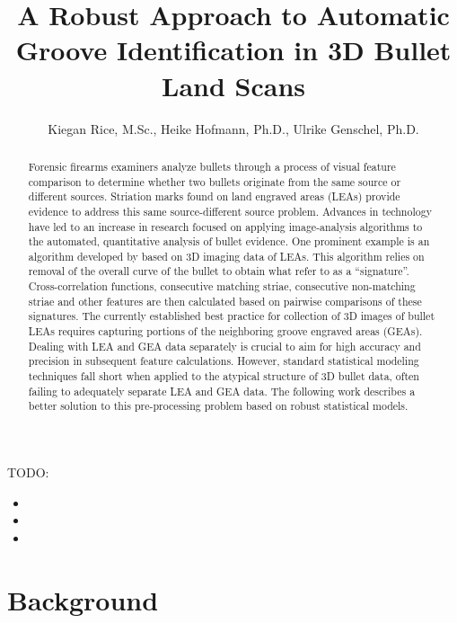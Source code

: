 \documentclass[]{article}
\title{A Robust Approach to Automatic Groove Identification in 3D Bullet Land
Scans}
\author{Kiegan Rice, M.Sc., Heike Hofmann, Ph.D., Ulrike Genschel, Ph.D.}
\date{}
\begin{document}
\maketitle
\begin{abstract}
Forensic firearms examiners analyze bullets through a process of visual
feature comparison to determine whether two bullets originate from the
same source or different sources. Striation marks found on land engraved
areas (LEAs) provide evidence to address this same source-different
source problem. Advances in technology have led to an increase in
research focused on applying image-analysis algorithms to the automated,
quantitative analysis of bullet evidence. One prominent example is an
algorithm developed by \citep{Hare1} based on 3D imaging data of LEAs.
This algorithm relies on removal of the overall curve of the bullet to
obtain what \citep{Hare1} refer to as a ``signature''. Cross-correlation
functions, consecutive matching striae, consecutive non-matching striae
and other features are then calculated based on pairwise comparisons of
these signatures. The currently established best practice for collection
of 3D images of bullet LEAs requires capturing portions of the
neighboring groove engraved areas (GEAs). Dealing with LEA and GEA data
separately is crucial to aim for high accuracy and precision in
subsequent feature calculations. However, standard statistical modeling
techniques fall short when applied to the atypical structure of 3D
bullet data, often failing to adequately separate LEA and GEA data. The
following work describes a better solution to this pre-processing
problem based on robust statistical models.
\end{abstract}

\newcommand{\hh}[1]{{\color{orange}{#1}}}

TODO:

\begin{itemize}
\item
  {\color{orange}{Could you remove the derivative files (tex, blg, writeup\_files, ...) from the repo? They cause a ton of merge conflicts.}}
\item
  {\color{orange}{I can't find the code for figure groove\_vs\_nogroove.png - I would like to split the figure into two subfigures (top) and (bottom) with extra lines of labelling options}}
\item
  {\color{orange}{replace the * multiplication by cdot or times}}
\end{itemize}

\section{Background}
\end{document}
